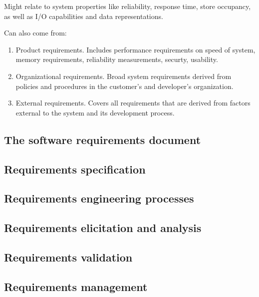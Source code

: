 \documentclass{article}
\begin{document}
Might relate to system properties like reliability, response time, store occupancy, as well as I/O capabilities and data representations.

Can also come from:
\begin{enumerate}
    \item Product requirements.  Includes performance requirements on speed of system, memory requirements, reliability measurements, securty, usability.
    \item Organizational requirements.  Broad system requirements derived from policies and procedures in the customer's and developer's organization.
    \item External requirements.  Covers all requirements that are derived from factors external to the system and its development process.
\end{enumerate}
\subsection{The software requirements document}
\subsection{Requirements specification}
\subsection{Requirements engineering processes}
\subsection{Requirements elicitation and analysis}
\subsection{Requirements validation}
\subsection{Requirements management}
\end{document}
